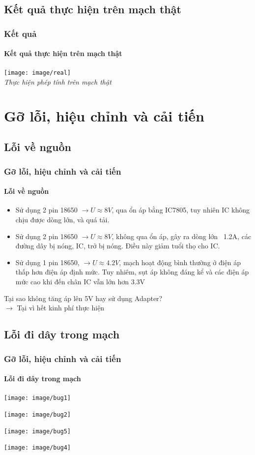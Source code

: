 \documentclass[12pt,a4paper]{beamer}
\begin{document}
\subsection{Kết quả thực hiện trên mạch thật}
\begin{frame}
	\frametitle{Kết quả}
	\framesubtitle{Kết quả thực hiện trên mạch thật}
	
	\begin{center}
		\texttt{[image: image/real]}\\
		\textit{Thực hiện phép tính trên mạch thật}
	\end{center}
	
\end{frame}

\section{Gỡ lỗi, hiệu chỉnh và cải tiến}\subsection{Lỗi về nguồn}
\begin{frame}
	\frametitle{Gỡ lỗi, hiệu chỉnh và cải tiến}
	\framesubtitle{Lỗi về nguồn}
	
	\begin{itemize}
		\item Sử dụng 2 pin 18650 $\to U \approx 8V$, qua ổn áp bằng IC7805, tuy nhiên IC không chịu được dòng lớn, và quá tải.
		\item  Sử dụng 2 pin 18650 $\to U \approx 8V$, không qua ổn áp, gây ra dòng lớn ~1.2A, các đường dây bị nóng, IC, trở bị nóng. Điều này giảm tuổi thọ cho IC.
		\item  Sử dụng 1 pin 18650, $\to U \approx 4.2V$, mạch hoạt động bình thường ở điện áp thấp hơn điện áp định mức. Tuy nhiêm, sụt áp không đáng kể và các điện áp mức cao khi đến chân IC vẫn lớn hơn 3.3V
	\end{itemize}
	Tại sao không tăng áp lên 5V hay sử dụng Adapter? \\$\to$ Tại vì hết kinh phí thực hiện 
\end{frame}
	\subsection{Lỗi đi dây trong mạch}
\begin{frame}
	\frametitle{Gỡ lỗi, hiệu chỉnh và cải tiến}
	\framesubtitle{Lỗi đi dây trong mạch}

	\begin{multicols}{2}
		\begin{center}
			\texttt{[image: image/bug1]}
		\end{center}
		\begin{center}
			\texttt{[image: image/bug2]}
		\end{center}
		\begin{center}
			\texttt{[image: image/bug5]}
		\end{center}
		\begin{center}
			\texttt{[image: image/bug4]}
		\end{center}
	\end{multicols}
\end{frame}
\end{document}
